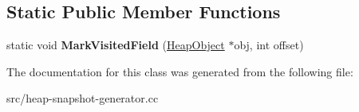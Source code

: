 \subsection*{Static Public Member Functions}
\begin{DoxyCompactItemize}
\item 
\hypertarget{classv8_1_1internal_1_1_indexed_references_extractor_a0d87156e55cb3a18861cc1e50a70dac4}{}static void {\bfseries Mark\+Visited\+Field} (\hyperlink{classv8_1_1internal_1_1_heap_object}{Heap\+Object} $\ast$obj, int offset)\label{classv8_1_1internal_1_1_indexed_references_extractor_a0d87156e55cb3a18861cc1e50a70dac4}

\end{DoxyCompactItemize}


The documentation for this class was generated from the following file\+:\begin{DoxyCompactItemize}
\item 
src/heap-\/snapshot-\/generator.\+cc\end{DoxyCompactItemize}
